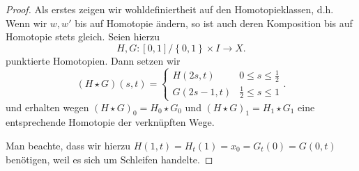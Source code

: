 \begin{proof}
    Als erstes zeigen wir wohldefiniertheit auf den Homotopieklassen, d.h. Wenn wir $w,w'$ bis auf Homotopie ändern, so ist auch deren Komposition bis auf Homotopie stets gleich. Seien hierzu
    \[
        H,G \colon  [0,1] / \left \{0,1\right\} \times I \to  X
    .\] 
    punktierte Homotopien. Dann setzen wir
    \[
        (H \star G) (s,t) = \begin{cases}
            H(2s,t) & 0 \leq  s \leq  \frac{1}{2} \\
            G(2s-1,t) & \frac{1}{2} \leq  s \leq  1
        \end{cases}
    .\] 
    und erhalten wegen $(H \star G)_0 = H_0 \star G_0$ und  $(H\star G) _1 = H_1 \star G_1$ eine entsprechende Homotopie der verknüpften Wege.

    Man beachte, dass wir hierzu $H(1,t) =H_t(1) =  x_0 = G_t(0) = G(0,t)$ benötigen, weil es sich um Schleifen handelte.


\end{proof}
